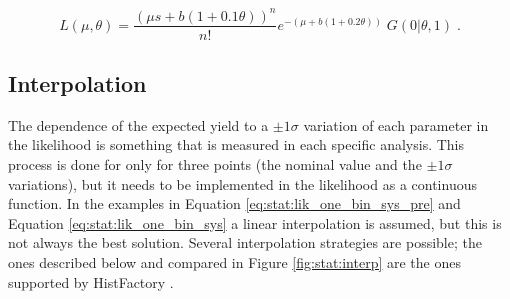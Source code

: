 \begin{equation}
\label{eq:stat:lik_one_bin_sys}
L(\mu, \theta) =
\frac{ (\mu s +
b(1 + 0.1\theta) )^{n} }{ n! }
e^{- (\mu  + b (1 + 0.2\theta) )}   \;
G( 0 | \theta, 1) \; .
\end{equation}

\subsection*{Interpolation}

The dependence of the expected yield to a $\pm 1 \sigma$ variation of each parameter in the likelihood is something that is measured in each specific analysis. This process is done for only for three points (the nominal value and the $\pm 1 \sigma$ variations), but it needs to be implemented in the likelihood as a continuous function. In the examples in Equation \ref{eq:stat:lik_one_bin_sys_pre} and Equation \ref{eq:stat:lik_one_bin_sys} a linear interpolation is assumed, but this is not always the best solution. 
Several interpolation strategies are possible; the ones described below and compared in Figure \ref{fig:stat:interp} are the ones supported by HistFactory \cite{Cranmer:1456844}.
 

